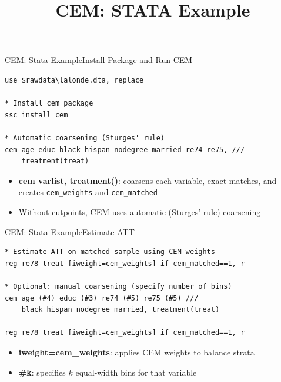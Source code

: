\documentclass[dvipsnames,hyperref={pdfpagelabels=false}]{beamer}
\begin{document}

\title[]
{CEM: STATA Example}

\author
{}

\institute{}

\date
{}

\begin{frame}{}
\titlepage
\end{frame}


\begin{frame}[fragile]{CEM: Stata Example}{Install Package and Run CEM}
\begin{lstlisting}
use $rawdata\lalonde.dta, replace

* Install cem package
ssc install cem

* Automatic coarsening (Sturges' rule)
cem age educ black hispan nodegree married re74 re75, ///
    treatment(treat)
\end{lstlisting}
	\begin{itemize}
		\vspace{0.2cm}
		\item \textbf{cem varlist, treatment()}: coarsens each variable, exact-matches, and creates \texttt{cem\_weights} and \texttt{cem\_matched}
		\vspace{0.2cm}
		\item Without cutpoints, CEM uses automatic (Sturges' rule) coarsening
	\end{itemize}
\end{frame}


\begin{frame}[fragile]{CEM: Stata Example}{Estimate ATT}
\begin{lstlisting}
* Estimate ATT on matched sample using CEM weights
reg re78 treat [iweight=cem_weights] if cem_matched==1, r

* Optional: manual coarsening (specify number of bins)
cem age (#4) educ (#3) re74 (#5) re75 (#5) ///
    black hispan nodegree married, treatment(treat)

reg re78 treat [iweight=cem_weights] if cem_matched==1, r
\end{lstlisting}
	\begin{itemize}
		\vspace{0.2cm}
		\item \textbf{iweight=cem\_weights}: applies CEM weights to balance strata
		\vspace{0.2cm}
		\item \textbf{\#k}: specifies $k$ equal-width bins for that variable
	\end{itemize}
\end{frame}
\end{document}
